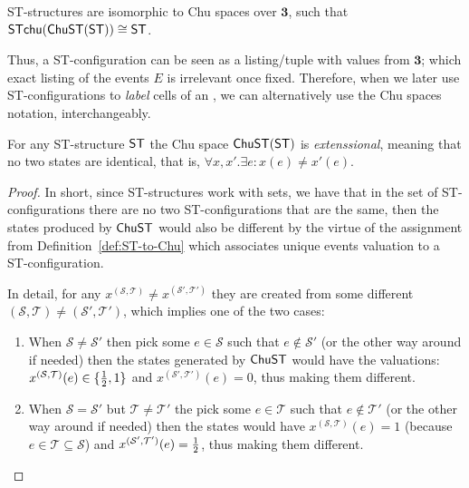     \begin{proposition}
        \label{prop:ST-structure-Chu-over-3}
        ST-structures are isomorphic to Chu spaces over $\mathbf{3}$, such that $\mathsf{ST}\mathsf{chu}(\mathsf{ChuST}(\mathsf{ST})) \cong \mathsf{ST}$.
    \end{proposition}
    
    Thus, a ST-configuration can be seen as a listing/tuple with values from $\mathbf{3}$; which exact listing of the events $E$ is irrelevant once fixed.  Therefore, when we later use ST-configurations to \emph{label} cells of an \HDA, we can alternatively use the Chu spaces notation, interchangeably.

    \begin{lemma}
        For any ST-structure $\mathsf{ST}$ the Chu space $\mathsf{ChuST}(\mathsf{ST})$ is \emph{extenssional}, meaning that no two states are identical, that is, $\forall x,x'.\exists e:x(e)\neq x'(e)$.
    \end{lemma}

    \begin{proof}
        In short, since ST-structures work with sets, we have that in the set of ST-configurations there are no two ST-configurations that are the same, then the states produced by $\mathsf{ChuST}$ would also be different by the virtue of the assignment from Definition~\ref{def:ST-to-Chu} which associates unique events valuation to a ST-configuration.

         In detail, for any $x^{(\mathcal{S},\mathcal{T})}\neq x^{(\mathcal{S}',\mathcal{T}')}$ they are created from some different $(\mathcal{S},\mathcal{T})\neq (\mathcal{S}',\mathcal{T}')$, which implies one of the two cases:
        
        \begin{enumerate}
            \item When $\mathcal{S} \neq \mathcal{S}'$ then pick some $e\in \mathcal{S}$ such  that $e\notin \mathcal{S}'$ (or the other way around if needed) then the states generated by $\mathsf{ChuST}$ would have the valuations: $x^{(\mathcal{S},\mathcal{T})}(e)\in\{\frac{1}{2},1\}$ and $x^{(\mathcal{S}',\mathcal{T}')}(e)=0$, thus making them different.
            \item When $\mathcal{S} = \mathcal{S}'$ but $\mathcal{T} \neq \mathcal{T}'$ the pick some $e \in \mathcal{T}$ such that $e \notin \mathcal{T}'$ (or the other way around if needed) then the states would have  $x^{(\mathcal{S},\mathcal{T})}(e)=1$ (because $e \in \mathcal{T} \subseteq \mathcal{S}$) and $x^{(\mathcal{S}',\mathcal{T}')}(e) = \frac{1}{2}$, thus making them different.
        \end{enumerate}
    \end{proof}
    
